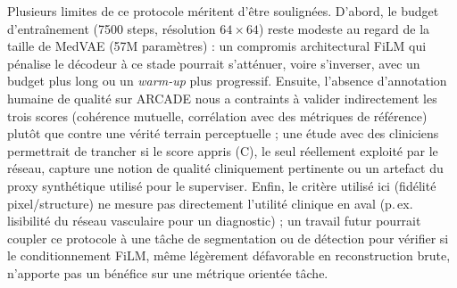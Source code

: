 \documentclass[conference]{IEEEtran}
\begin{document}
Plusieurs limites de ce protocole méritent d'être soulignées. D'abord, le
budget d'entraînement (7500 steps, résolution $64\times64$) reste modeste
au regard de la taille de MedVAE (57M paramètres) : un compromis
architectural FiLM qui pénalise le décodeur à ce stade pourrait s'atténuer,
voire s'inverser, avec un budget plus long ou un \emph{warm-up} plus
progressif. Ensuite, l'absence d'annotation humaine de qualité sur ARCADE
nous a contraints à valider indirectement les trois scores (cohérence
mutuelle, corrélation avec des métriques de référence) plutôt que contre
une vérité terrain perceptuelle ; une étude avec des cliniciens permettrait
de trancher si le score appris (C), le seul réellement exploité par le
réseau, capture une notion de qualité cliniquement pertinente ou un
artefact du proxy synthétique utilisé pour le superviser. Enfin, le critère
utilisé ici (fidélité pixel/structure) ne mesure pas directement l'utilité
clinique en aval (p.\,ex. lisibilité du réseau vasculaire pour un
diagnostic) ; un travail futur pourrait coupler ce protocole à une tâche de
segmentation ou de détection pour vérifier si le conditionnement FiLM, même
légèrement défavorable en reconstruction brute, n'apporte pas un bénéfice
sur une métrique orientée tâche.
\end{document}
